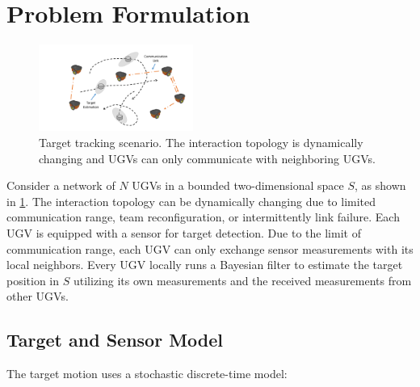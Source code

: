 \section{Problem Formulation}\label{sec:prob}
\begin{figure}%
	\centering
	\includegraphics[width=0.45\textwidth]{figures/scenario}
	\caption{Target tracking scenario. The interaction topology is dynamically changing and UGVs can only communicate with neighboring UGVs.}
	\label{fig:scenario}
\end{figure}
	Consider a network of $N$ UGVs in a bounded two-dimensional space $S$, as shown in \cref{fig:scenario}.
	The interaction topology can be dynamically changing due to limited communication range, team reconfiguration, or intermittently link failure.
	Each UGV is equipped with a sensor for target detection. 
	Due to the limit of communication range, each UGV can only exchange sensor measurements with its local neighbors. 
	Every UGV locally runs a Bayesian filter to estimate the target position in $S$ utilizing its own measurements and the received measurements from other UGVs. 
	
	\subsection{Target and Sensor Model}
	The target motion uses a stochastic discrete-time model: %
	
